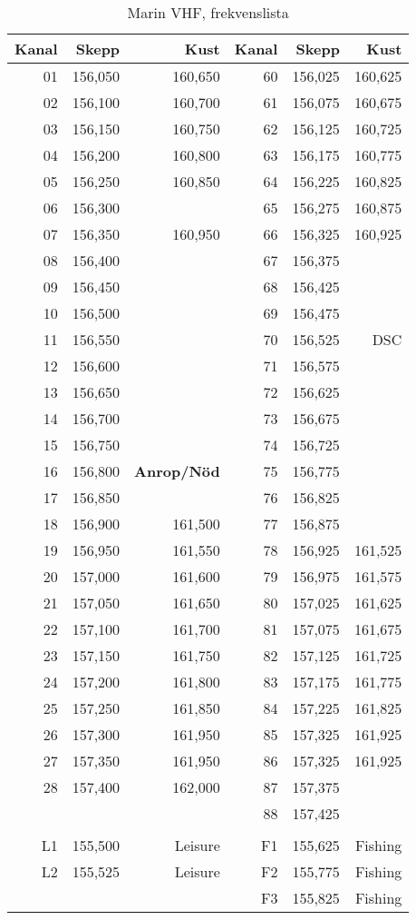 {\begin{longtable}{rrr|rrr}
\caption{Marin VHF, frekvenslista} \\
\textbf{Kanal} & \textbf{Skepp} & \textbf{Kust} &
\textbf{Kanal} & \textbf{Skepp} & \textbf{Kust} \\ \hline \endhead
01 & 156,050 & 160,650 & 60 & 156,025 & 160,625 \\
02 & 156,100 & 160,700 & 61 & 156,075 & 160,675 \\
03 & 156,150 & 160,750 & 62 & 156,125 & 160,725 \\
04 & 156,200 & 160,800 & 63 & 156,175 & 160,775 \\
05 & 156,250 & 160,850 & 64 & 156,225 & 160,825 \\
06 & 156,300 &         & 65 & 156,275 & 160,875 \\
07 & 156,350 & 160,950 & 66 & 156,325 & 160,925 \\
08 & 156,400 &         & 67 & 156,375 & \\
09 & 156,450 &         & 68 & 156,425 & \\
10 & 156,500 &         & 69 & 156,475 & \\
11 & 156,550 &         & 70 & 156,525 & DSC \\
12 & 156,600 &         & 71 & 156,575 & \\
13 & 156,650 &         & 72 & 156,625 & \\
14 & 156,700 &         & 73 & 156,675 & \\
15 & 156,750 &         & 74 & 156,725 & \\
16 & 156,800 & \bf Anrop/Nöd    & 75 & 156,775 & \\
17 & 156,850 &         & 76 & 156,825 & \\
18 & 156,900 & 161,500 & 77 & 156,875 & \\
19 & 156,950 & 161,550 & 78 & 156,925 & 161,525 \\
20 & 157,000 & 161,600 & 79 & 156,975 & 161,575 \\
21 & 157,050 & 161,650 & 80 & 157,025 & 161,625 \\
22 & 157,100 & 161,700 & 81 & 157,075 & 161,675 \\
23 & 157,150 & 161,750 & 82 & 157,125 & 161,725 \\
24 & 157,200 & 161,800 & 83 & 157,175 & 161,775 \\
25 & 157,250 & 161,850 & 84 & 157,225 & 161,825 \\
26 & 157,300 & 161,950 & 85 & 157,325 & 161,925 \\
27 & 157,350 & 161,950 & 86 & 157,325 & 161,925 \\
28 & 157,400 & 162,000 & 87 & 157,375 & \\
   &         &         & 88 & 157,425 & \\
   &         &         &    &         & \\
L1 & 155,500 & Leisure        & F1 & 155,625 &Fishing \\
L2 & 155,525 & Leisure        & F2 & 155,775 &Fishing \\
   &         &         & F3 & 155,825 & Fishing\\
\end{longtable}

}
